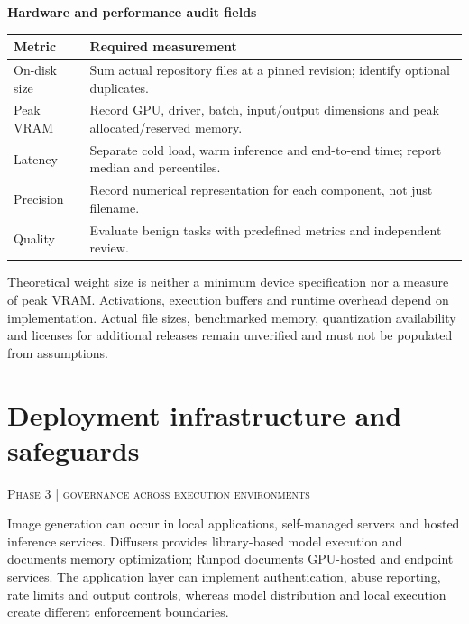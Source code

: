 \documentclass[11pt,a4paper]{article}
\newcommand{\sect}[2]{\section{#1}\textcolor{muted}{\small\textsc{#2}}\par\vspace{2mm}}
\newcommand{\sub}[1]{\vspace{1mm}\textbf{#1}\par}
\begin{document}
\sub{Hardware and performance audit fields}

\begin{center}\small\begin{tabularx}{\linewidth}{@{}YY@{}}\toprule
\textbf{Metric} & \textbf{Required measurement}\\\midrule
On-disk size & Sum actual repository files at a pinned revision; identify optional duplicates.\\
Peak VRAM & Record GPU, driver, batch, input/output dimensions and peak allocated/reserved memory.\\
Latency & Separate cold load, warm inference and end-to-end time; report median and percentiles.\\
Precision & Record numerical representation for each component, not just filename.\\
Quality & Evaluate benign tasks with predefined metrics and independent review.\\\bottomrule\end{tabularx}\end{center}

Theoretical weight size is neither a minimum device specification nor a measure of peak VRAM. Activations, execution buffers and runtime overhead depend on implementation. Actual file sizes, benchmarked memory, quantization availability and licenses for additional releases remain unverified and must not be populated from assumptions.


\clearpage\sect{Deployment infrastructure and safeguards}{Phase 3 | governance across execution environments}

Image generation can occur in local applications, self-managed servers and hosted inference services. Diffusers provides library-based model execution and documents memory optimization; Runpod documents GPU-hosted and endpoint services. The application layer can implement authentication, abuse reporting, rate limits and output controls, whereas model distribution and local execution create different enforcement boundaries. \cite{memory,runpod}
\end{document}
